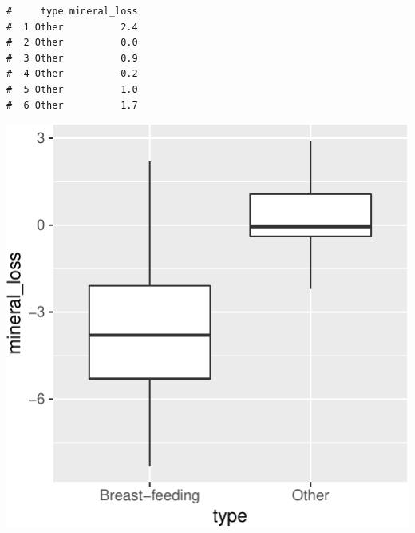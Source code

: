 \documentclass[letterpaper,9pt,twoside,printwatermark=false]{pinp}
\begin{document}
\begin{ShadedResult}
\begin{verbatim}
#     type mineral_loss
#  1 Other          2.4
#  2 Other          0.0
#  3 Other          0.9
#  4 Other         -0.2
#  5 Other          1.0
#  6 Other          1.7
\end{verbatim}
\end{ShadedResult}

\begin{Shaded}
\begin{Highlighting}[]
\OperatorTok{::}\OperatorTok{~}\StringTok{ }
\end{Highlighting}
\end{Shaded}

\begin{center}\includegraphics{a5_ttest_files/figure-latex/unnamed-chunk-3-1} \end{center}
\end{document}
